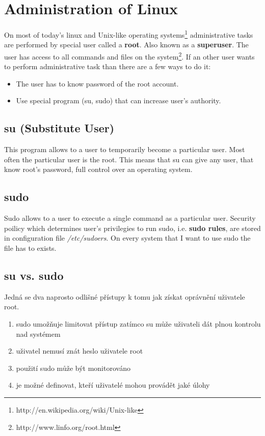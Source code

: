 \documentclass[10pt,a4paper,notitlepage]{article}
\begin{document}
\section{Administration of Linux}
On most of today's linux and Unix-like operating
systems\footnote{http://en.wikipedia.org/wiki/Unix-like} administrative tasks
are performed by special user called a \textbf{root}. Also known as a \textbf{superuser}. The user has
access to all commands and files on the
system\footnote{http://www.linfo.org/root.html}. If an other user wants to
perform administrative task than there are a few ways to do it: 
\begin{itemize}
	\item The user has to know password of the root account.
	\item Use special program (su, sudo)  that can increase user's authority.
\end{itemize}


\subsection{su (Substitute User)}
This program allows to a user to temporarily become a particular user. Most
often the particular user is the root. This means that su can give any user, that
know root's password,  full control over an operating  system.



\subsection{sudo}
Sudo allows to a user to execute a single command as a particular user. Security
poilicy which determines user's privilegies to run sudo, i.e. \textbf{sudo
rules}, are stored in configuration file \emph{/etc/sudoers}. On every system
that I want to use sudo the file has to exists.



\subsection{su vs. sudo}
Jedná se dva naprosto odlišné přístupy k tomu jak získat oprávnění uživatele
root.

\begin{enumerate}
	\item sudo umožňuje limitovat přístup zatímco su může uživateli dát plnou
		kontrolu nad systémem
	\item uživatel nemusí znát heslo uživatele root
	\item použití sudo může být monitorováno
	\item je možné definovat, kteří uživatelé mohou provádět jaké úlohy
\end{enumerate}
\end{document}
